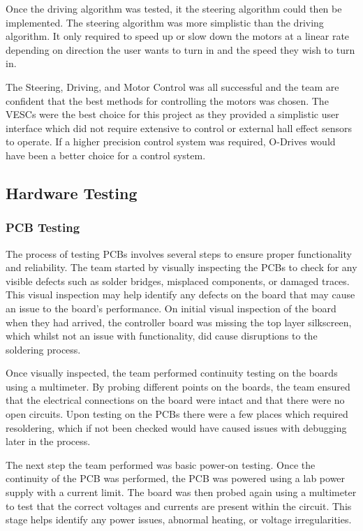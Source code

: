 \documentclass [12pt]{article}
\begin{document}
Once the driving algorithm was tested, it the steering algorithm could then be implemented. The steering algorithm was more simplistic than the driving algorithm. It only required to speed up or slow down the motors at a linear rate depending on direction the user wants to turn in and the speed they wish to turn in. 

The Steering, Driving, and Motor Control was all successful and the team are confident that the best methods for controlling the motors was chosen. The VESCs were the best choice for this project as they provided a simplistic user interface which did not require extensive to control or external hall effect sensors to operate. If a higher precision control system was required, O-Drives would have been a better choice for a control system. 

\subsection{Hardware Testing}

\subsubsection{PCB Testing}

The process of testing PCBs involves several steps to ensure proper functionality and reliability. The team started by visually inspecting the PCBs to check for any visible defects such as solder bridges, misplaced components, or damaged traces. This visual inspection may help identify any defects on the board that may cause an issue to the board’s performance. On initial visual inspection of the board when they had arrived, the controller board was missing the top layer silkscreen, which whilst not an issue with functionality, did cause disruptions to the soldering process. 

Once visually inspected, the team performed continuity testing on the boards using a multimeter. By probing different points on the boards, the team ensured that the electrical connections on the board were intact and that there were no open circuits.  Upon testing on the PCBs there were a few places which required resoldering, which if not been checked would have caused issues with debugging later in the process. 

The next step the team performed was basic power-on testing. Once the continuity of the PCB was performed, the PCB was powered using a lab power supply with a current limit. The board was then probed again using a multimeter to test that the correct voltages and currents are present within the circuit. This stage helps identify any power issues, abnormal heating, or voltage irregularities. 
\end{document}
